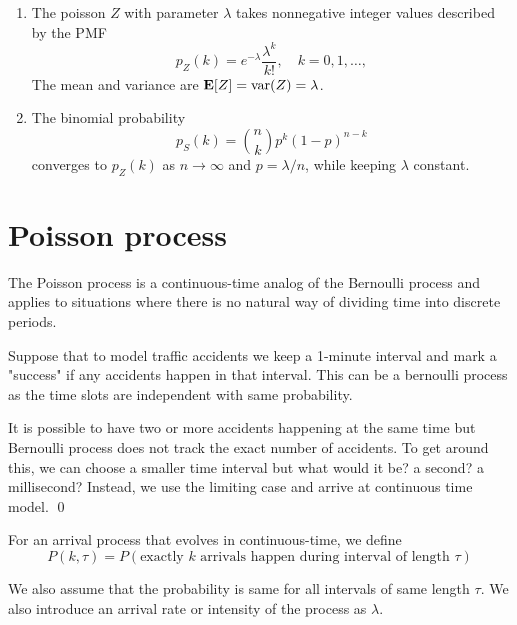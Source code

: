\begin{enumerate}
    \item The poisson \rv $Z$ with parameter $\lambda$ takes nonnegative integer values described by the PMF 
    \[p_Z(k)=e^{-\lambda}\frac{\lambda^k}{k!}, \quad k=0,1,\ldots,\]
    The mean and variance are $\operatorname{\textbf{E}}[Z]=\operatorname{\text{var}}(Z)=\lambda$.
    \item The binomial probability \[p_S(k)=\binom{n}{k}p^k(1-p)^{n-k}\] converges to $p_Z(k)$ as $n \to \infty$ and $p=\lambda/n$, while keeping $\lambda$ constant.
\end{enumerate}

\section{Poisson process}
The Poisson process is a continuous-time analog of the Bernoulli process and applies to situations where there is no natural way of dividing time into discrete periods.

\begin{example}
    Suppose that to model traffic accidents we keep a 1-minute interval and mark a "success" if any accidents happen in that interval. This can be a bernoulli process as the time slots are independent with same probability.
    
    It is possible to have two or more accidents happening at the same time but Bernoulli process does not track the exact number of accidents. To get around this, we can choose a smaller time interval but what would it be? a second? a millisecond? Instead, we use the limiting case and arrive at continuous time model. \qed
\end{example}

For an arrival process that evolves in continuous-time, we define
\[P(k,\tau)=P(\text{exactly } k \text{ arrivals happen during interval of length } \tau)\]

We also assume that the probability is same for all intervals of same length $\tau$. We also introduce an arrival rate or intensity of the process as $\lambda$.

